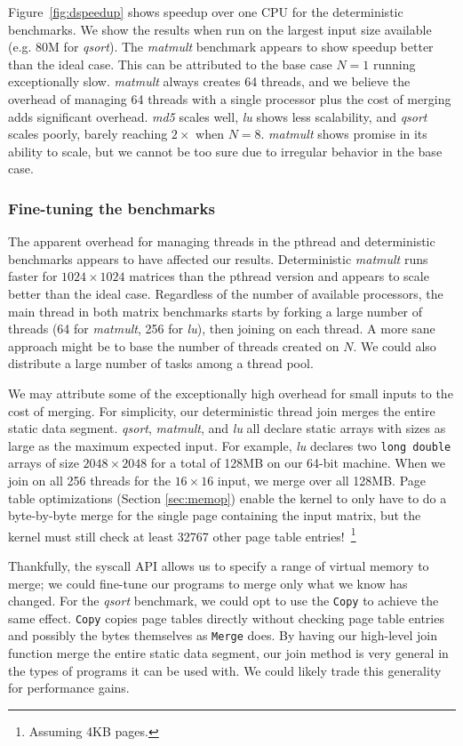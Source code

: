 
\mbox{Figure \ref{fig:dspeedup}} shows speedup over one CPU for the deterministic
benchmarks. We show the results when run on the largest input size available
(e.g. 80M for \emph{qsort}). The \emph{matmult} benchmark appears to show
speedup better than the ideal case. This can be attributed to the base case
$N=1$ running exceptionally slow. \emph{matmult} always creates 64 threads, and
we believe the overhead of managing 64 threads with a single processor plus the
cost of merging adds significant overhead. \emph{md5} scales well,
\emph{lu} shows less scalability, and \emph{qsort} scales poorly, barely
reaching $2\times$ when $N=8$. \emph{matmult} shows promise in its ability to
scale, but we cannot be too sure due to irregular behavior in the base case.

\subsubsection{Fine-tuning the benchmarks}
\label{sec:finetune}
The apparent overhead for managing threads in the pthread and deterministic
benchmarks appears to have affected our results. Deterministic \emph{matmult}
runs faster for $1024\times 1024$ matrices than the pthread version and appears
to scale better than the ideal case. Regardless of the number of available
processors, the main thread in both matrix benchmarks starts by forking a large
number of threads (64 for \emph{matmult}, 256 for \emph{lu}), then joining on
each thread. A more sane approach might be to base the number of threads created
on $N$. We could also distribute a large number of tasks among a thread pool.

We may attribute some of the exceptionally high overhead for small inputs to
the cost of merging. For simplicity, our deterministic thread join merges the
entire static data segment. \emph{qsort}, \emph{matmult}, and \emph{lu} all
declare static arrays with sizes as large as the maximum expected input. For
example, \emph{lu} declares two {\tt long double} arrays of size
$2048\times 2048$ for a total of 128MB on our 64-bit machine. When we join on
all 256 threads for the $16\times 16$ input, we merge over all 128MB. Page
table optimizations (Section \ref{sec:memop}) enable the kernel to only have to
do a \mbox{byte-by-byte} merge for the single page containing the input matrix,
but the kernel must still check at least 32767 other page table
entries!~\footnote{Assuming 4KB pages.}

Thankfully, the syscall API allows us to specify a range of virtual memory to
merge; we could fine-tune our programs to merge only what we know has changed.
For the \emph{qsort} benchmark, we could opt to use the {\tt Copy} to achieve
the same effect. {\tt Copy} copies page tables directly without checking page
table entries and possibly the bytes themselves as {\tt Merge} does. By having
our high-level join function merge the entire static data segment, our join
method is very general in the types of programs it can be used with. We could
likely trade this generality for performance gains.

